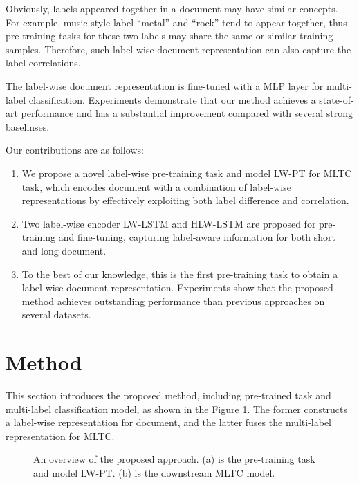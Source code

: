 \documentclass[runningheads]{llncs}
\begin{document}
Obviously, labels appeared together in a document may have similar concepts. For example, music style label ``metal'' and ``rock'' tend to appear together, thus pre-training tasks for these two labels may share the same or similar training samples. Therefore, such label-wise document representation can also capture the label correlations.

The label-wise document representation is fine-tuned with a MLP layer for multi-label classification. Experiments demonstrate that our method achieves a state-of-art performance and has a substantial improvement compared with several strong baselinses.

Our contributions are as follows:
\begin{enumerate}
    \item We propose a novel label-wise pre-training task and model LW-PT for MLTC task, which encodes document with a combination of label-wise representations by effectively exploiting both label difference and correlation.
    \item Two label-wise encoder LW-LSTM and HLW-LSTM are proposed for pre-training and fine-tuning, capturing label-aware information for both short and long document.   
    \item To the best of our knowledge, this is the first pre-training task to obtain a label-wise document representation. Experiments show that the proposed method achieves outstanding performance than previous approaches on several datasets.
\end{enumerate}

\section{Method}
This section introduces the proposed method, including pre-trained task and multi-label classification model, as shown in the Figure \ref{model:overview}. The former constructs a label-wise representation for document, and the latter fuses the multi-label representation for MLTC.
\begin{figure}[htb]
    \centering
    \caption{An overview of the proposed approach. (a) is the pre-training task and model LW-PT. (b) is the downstream MLTC model.}
    \label{model:overview}
\end{figure}
\end{document}
